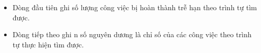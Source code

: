 \begin{itemize}
	\item     Dòng đầu tiên ghi số lượng công việc bị hoàn thành trễ hạn theo trình tự tìm được.   
	\item     Dòng tiếp theo ghi n số nguyên dương là chỉ số của các công việc theo trình tự thực hiện tìm được.   
\end{itemize}